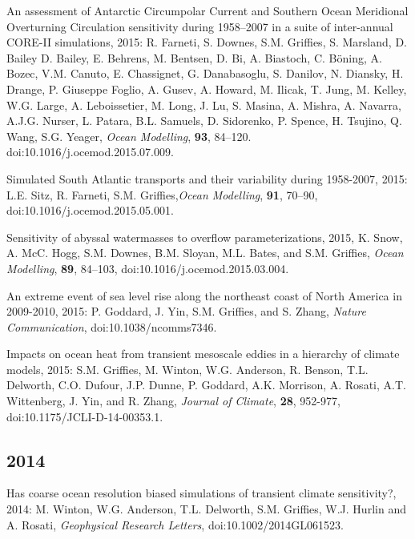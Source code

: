 \begin{etaremune}

\item An assessment of Antarctic Circumpolar Current and Southern  Ocean Meridional Overturning Circulation sensitivity during  1958--2007 in a suite of inter-annual CORE-II simulations, 2015:
  R. Farneti, S. Downes, S.M. Grif\/f\/ies, S. Marsland,
  D. Bailey D. Bailey, E. Behrens, M. Bentsen, D. Bi, A. Biastoch,  C. B\"oning, A. Bozec, V.M. Canuto, E. Chassignet, G. Danabasoglu,  S. Danilov, N. Diansky, H. Drange, P. Giuseppe Foglio, A. Gusev,  A. Howard, M. Ilicak, T.  Jung, M. Kelley, W.G. Large,
  A. Leboissetier, M. Long, J. Lu, S. Masina, A. Mishra, A. Navarra,  A.J.G. Nurser, L. Patara, B.L. Samuels, D. Sidorenko, P. Spence,  H. Tsujino, Q. Wang, S.G. Yeager, {\it Ocean Modelling}, {\bf 93},
  84--120. doi:10.1016/j.ocemod.2015.07.009.

\item Simulated South Atlantic transports and their variability during 1958-2007, 2015: L.E.  Sitz, R. Farneti, S.M. Grif\/f\/ies,{\it Ocean Modelling}, {\bf 91}, 70--90, doi:10.1016/j.ocemod.2015.05.001.

\item Sensitivity of abyssal watermasses to overflow parameterizations, 2015, K. Snow, A. McC. Hogg, S.M. Downes,  B.M. Sloyan, M.L. Bates, and S.M. Grif\/f\/ies, {\it Ocean Modelling}, {\bf 89}, 84--103, doi:10.1016/j.ocemod.2015.03.004.

\item An extreme event of sea level rise along the northeast coast of North America in 2009-2010, 2015: P.  Goddard, J. Yin, S.M. Grif\/f\/ies, and S. Zhang, {\it Nature Communication}, doi:10.1038/ncomms7346.

\item Impacts on ocean heat from transient mesoscale eddies in a hierarchy of climate models, 2015: S.M. Grif\/f\/ies, M. Winton, W.G. Anderson, R. Benson, T.L. Delworth, C.O. Dufour, J.P. Dunne, P. Goddard, A.K. Morrison, A. Rosati, A.T. Wittenberg, J. Yin, and R. Zhang, {\it Journal of Climate}, {\bf 28}, 952-977, doi:10.1175/JCLI-D-14-00353.1.

\subsection*{\sc \color{Maroon} 2014}


\item Has coarse ocean resolution biased simulations of transient climate sensitivity?, 2014: M.  Winton, W.G. Anderson, T.L. Delworth, S.M. Grif\/f\/ies, W.J. Hurlin and A. Rosati, {\it Geophysical Research Letters}, doi:10.1002/2014GL061523.


\end{etaremune}
